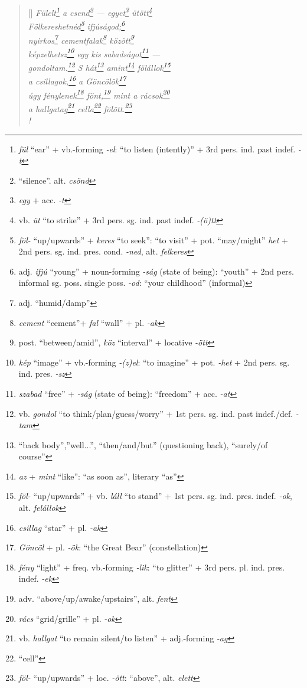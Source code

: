 \documentclass[a4paper,12pt,twoside,final]{book}
\begin{document}
\begin{verse}[\versewidth]
  \it
  Fülelt\footnote{\emph{fül} ``ear'' + vb.-forming \emph{-el}: ``to
  listen (intently)'' + 3rd pers. ind. past indef. \emph{-t}} a
  csend\footnote{``silence''. alt. \emph{csönd}}
  --- egyet\footnote{\emph{egy} + acc. \emph{-t}}
  ütött\footnote{vb. \emph{üt} ``to strike'' + 3rd
  pers. sg. ind. past indef. \emph{-(ö)tt}} \\
  Fölkereshetnéd\footnote{\emph{föl-}
  ``up/upwards'' + \emph{keres} ``to seek'': ``to visit'' +
  pot. ``may/might'' \emph{het} + 2nd
  pers. sg. ind. pres. cond. \emph{-ned}, alt. \emph{felkeres}}
  ifjúságod;\footnote{adj. \emph{ifjú} ``young'' + noun-forming
  \emph{-ság} (state of being): ``youth'' + 2nd pers. informal sg.
  poss. single poss. \emph{-od}: ``your childhood'' (informal)} \\
  nyirkos\footnote{adj. ``humid/damp''}
  cementfalak\footnote{\emph{cement} ``cement''+ \emph{fal} ``wall'' +
  pl. \emph{-ak}} között\footnote{post. ``between/amid'', \emph{köz}
  ``interval'' + locative \emph{-ött}} \\
  képzelhetsz\footnote{\emph{kép} ``image'' + vb.-forming
  \emph{-(z)el}: ``to imagine'' + pot. \emph{-het} + 2nd
  pers. sg. ind. pres. \emph{-sz}} egy kis
  sabadságot\footnote{\emph{szabad} ``free'' + \emph{-ság} (state of
  being): ``freedom'' + acc. \emph{-at}} --- \\
  gondoltam.\footnote{vb. \emph{gondol} ``to
  think/plan/guess/worry'' + 1st pers. sg. ind. past
  indef./def. \emph{-tam}} S hát\footnote{``back body'',''well...'',
  ``then/and/but'' (questioning back), ``surely/of course''}
  amint\footnote{\emph{az} + \emph{mint} ``like'': ``as soon as'',
  literary ``as''} fölállok\footnote{\emph{föl-}
  ``up/upwards'' +  vb. \emph{láll} ``to stand'' + 1st
  pers. sg. ind. pres. indef. \emph{-ok}, alt. \emph{felállok}} \\
  a csillagok,\footnote{\emph{csillag} ``star'' + pl. \emph{-ak}} a
  Göncölök\footnote{\emph{Göncöl} + pl. \emph{-ök}: ``the Great Bear''
  (constellation)} \\
  úgy fénylenek\footnote{\emph{fény} ``light'' + freq. vb.-forming
  \emph{-lik}: ``to glitter'' + 3rd
  pers. pl. ind. pres. indef. \emph{-ek}}
  fönt,\footnote{adv. ``above/up/awake/upstairs'', alt. \emph{fent}}
  mint a rácsok\footnote{\emph{rács} ``grid/grille'' + pl. \emph{-ok}} \\
  a hallgatag\footnote{vb. \emph{hallgat} ``to remain silent/to
  listen'' + adj.-forming \emph{-ag}} cella\footnote{``cell''}
  fölött.\footnote{\emph{föl-} ``up/upwards'' +  loc. \emph{-ött}:
  ``above'', alt. \emph{elett}} \\!
\end{verse}
\end{document}
